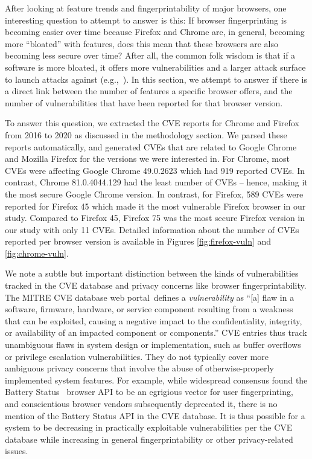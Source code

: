 After looking at feature trends and fingerprintability of major
browsers, one interesting question to attempt to answer is this: If
browser fingerprinting is becoming easier over time because Firefox
and Chrome are, in general, becoming more ``bloated'' with features,
does this mean that these browsers are also becoming less secure over
time?  After all, the common folk wisdom is that if a software is more
bloated, it offers more vulnerabilities and a larger attack surface to
launch attacks against (e.g.,~\cite{Bloating}). In this section, we
attempt to answer if there is a direct link between the number of
features a specific browser offers, and the number of vulnerabilities
that have been reported for that browser version.

To answer this question, we extracted the CVE reports for Chrome and
Firefox from 2016 to 2020 as discussed in the methodology section. We
parsed these reports automatically, and generated CVEs that are
related to Google Chrome and Mozilla Firefox for the versions we were
interested in. For Chrome, most CVEs were affecting Google Chrome
49.0.2623 which had 919 reported CVEs. In contrast, Chrome
81.0.4044.129 had the least number of CVEs -- hence, making it the
most secure Google Chrome version. In contrast, for Firefox, 589 CVEs
were reported for Firefox 45 which made it the most vulnerable Firefox
browser in our study. Compared to Firefox 45, Firefox 75 was the most
secure Firefox version in our study with only 11 CVEs. Detailed
information about the number of CVEs reported per browser version is
available in Figures \ref{fig:firefox-vuln} and \ref{fig:chrome-vuln}.

We note a subtle but important distinction between the kinds of
vulnerabilities tracked in the CVE database and privacy concerns like
browser fingerprintability. The MITRE CVE database web
portal~\footnotemark defines a \textit{vulnerability} as ``[a] flaw in a
software, firmware, hardware, or service component resulting from a
weakness that can be exploited, causing a negative impact to the
confidentiality, integrity, or availability of an impacted component or
components.''
CVE entries thus track unambiguous flaws in system design or
implementation, such as buffer overflows or privilege escalation
vulnerabilities.  They do not typically cover more ambiguous privacy
concerns that involve the abuse of otherwise-properly implemented system
features. For example, while widespread consensus found the Battery
Status~\cite{olejnik2017battery} browser API to be an egrigious vector
for user fingerprinting, and conscientious browser vendors subsequently
deprecated it, there is no mention of the Battery Status API in the CVE
database. It is thus possible for a system to be decreasing in
practically exploitable vulnerabilities per the CVE database while
increasing in general fingerprintability or other privacy-related
issues.

